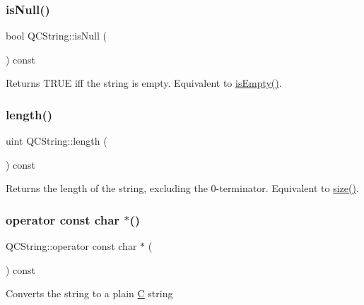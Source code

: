 \subsubsection{\texorpdfstring{isNull()}{isNull()}}
{\footnotesize\ttfamily bool Q\+C\+String\+::is\+Null (\begin{DoxyParamCaption}{ }\end{DoxyParamCaption}) const\hspace{0.3cm}{\ttfamily [inline]}}

Returns T\+R\+UE iff the string is empty. Equivalent to \mbox{\hyperlink{class_q_c_string_a621c4090d69ad7d05ef8e5234376c3d8}{is\+Empty()}}. \mbox{\label{class_q_c_string_ac52596733e9110b778019946d73fb268}} 
\subsubsection{\texorpdfstring{length()}{length()}}
{\footnotesize\ttfamily uint Q\+C\+String\+::length (\begin{DoxyParamCaption}{ }\end{DoxyParamCaption}) const\hspace{0.3cm}{\ttfamily [inline]}}

Returns the length of the string, excluding the 0-\/terminator. Equivalent to \mbox{\hyperlink{class_q_c_string_ac084f55ab51f8b277cf01bb6e04f16ed}{size()}}. \mbox{\label{class_q_c_string_adf09db1887736ab6432cf0fff1cd9aec}} 
\subsubsection{\texorpdfstring{operator const char $\ast$()}{operator const char *()}}
{\footnotesize\ttfamily Q\+C\+String\+::operator const char $\ast$ (\begin{DoxyParamCaption}{ }\end{DoxyParamCaption}) const\hspace{0.3cm}{\ttfamily [inline]}}

Converts the string to a plain \mbox{\hyperlink{class_c}{C}} string \mbox{\label{class_q_c_string_a62d09e50a2a9ea29e7dfc5eb98f8d837}} 
